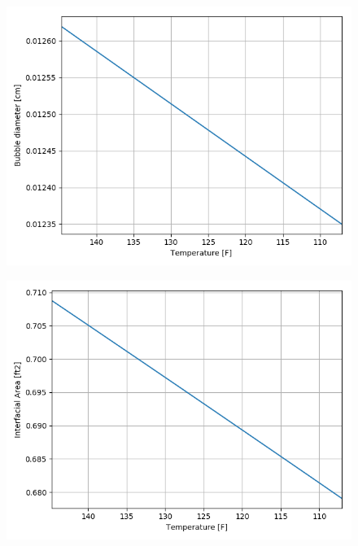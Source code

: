 \begin{figure}[p] 
\centering
\begin{minipage}{.5\textwidth}
  \centering
  \includegraphics[width=.9\linewidth]{images/BubbleDiaTemperatureDecrease.png}
  \label{fig:temp_decrease_bubDia}
\end{minipage}%
\begin{minipage}{.5\textwidth}
  \centering
  \includegraphics[width=.9\linewidth]{images/IntAreaTemperatureDecrease.png}
  \label{fig:temp_decrease_intArea}
\end{minipage}
\end{figure}

\FloatBarrier
\newpage
\FloatBarrier

